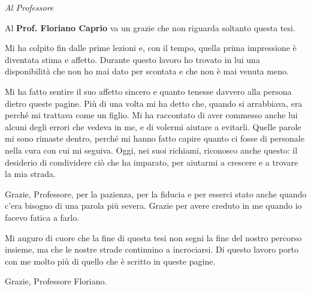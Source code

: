 \ifdefined\copiarelatore\else
\vspace{5mm}
\begin{center}
    \textit{Al Professore}
\end{center}
\vspace{5mm}
\fi

Al \textbf{Prof. Floriano Caprio} va un grazie che non riguarda soltanto questa tesi.

Mi ha colpito fin dalle prime lezioni e, con il tempo, quella prima impressione è diventata stima e affetto. Durante questo lavoro ho trovato in lui una disponibilità che non ho mai dato per scontata e che non è mai venuta meno.

Mi ha fatto sentire il suo affetto sincero e quanto tenesse davvero alla persona dietro queste pagine. Più di una volta mi ha detto che, quando si arrabbiava, era perché mi trattava come un figlio. Mi ha raccontato di aver commesso anche lui alcuni degli errori che vedeva in me, e di volermi aiutare a evitarli. Quelle parole mi sono rimaste dentro, perché mi hanno fatto capire quanto ci fosse di personale nella cura con cui mi seguiva. Oggi, nei suoi richiami, riconosco anche questo: il desiderio di condividere ciò che ha imparato, per aiutarmi a crescere e a trovare la mia strada.

Grazie, Professore, per la pazienza, per la fiducia e per esserci stato anche quando c'era bisogno di una parola più severa. Grazie per avere creduto in me quando io facevo fatica a farlo.

Mi auguro di cuore che la fine di questa tesi non segni la fine del nostro percorso insieme, ma che le nostre strade continuino a incrociarsi. Di questo lavoro porto con me molto più di quello che è scritto in queste pagine.

Grazie, Professore Floriano.
